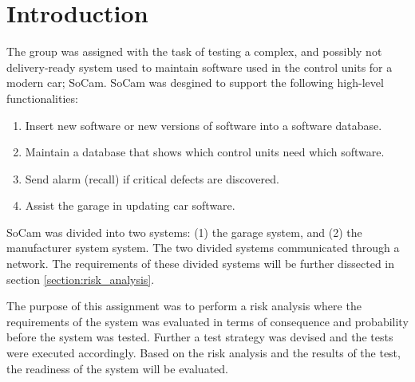 \section{Introduction}

The group was assigned with the task of testing a complex, and possibly not delivery-ready system used to maintain software used in the control units for a modern car; SoCam. SoCam was desgined to support the following high-level functionalities:

\begin{enumerate}
    \item Insert new software or new versions of software into a software database.
    \item Maintain a database that shows which control units need which software.
    \item Send alarm (recall) if critical defects are discovered.
    \item Assist the garage in updating car software.
\end{enumerate}

\noindent SoCam was divided into two systems: (1) the garage system, and (2) the manufacturer system system. The two divided systems communicated through a network. The requirements of these divided systems will be further dissected in section \ref{section:risk_analysis}.


The purpose of this assignment was to perform a risk analysis where the requirements of the system was evaluated in terms of consequence and probability before the system was tested. Further a test strategy was devised and the tests were executed accordingly. Based on the risk analysis and the results of the test, the readiness of the system will be evaluated. 

